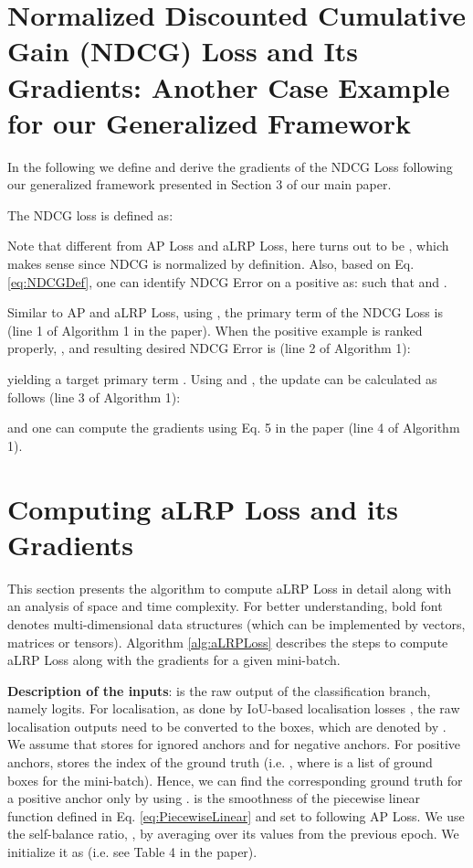 \documentclass{article}
\begin{document}
\section{Normalized Discounted Cumulative Gain (NDCG) Loss and Its Gradients: Another Case Example for our Generalized Framework}
In the following we define and derive the gradients of the NDCG Loss \cite{OptimizingUpperBound} following our generalized framework presented in Section 3 of our main paper.

The NDCG loss is defined as:

Note that different from AP Loss and aLRP Loss, here  turns out to be , which makes sense since NDCG is normalized by definition. Also, based on Eq. \ref{eq:NDCGDef}, one can identify NDCG Error on a positive as:  such that  and  .  

Similar to AP and aLRP Loss, using , the primary term of the NDCG Loss is  (line 1 of Algorithm 1 in the paper). When the positive example  is ranked properly, , and resulting desired NDCG Error is (line 2 of Algorithm 1):

yielding a target primary term . Using  and , the update can be calculated as follows (line 3 of Algorithm 1):

and one can compute the gradients using Eq. 5 in the paper (line 4 of Algorithm 1). \section{Computing aLRP Loss and its Gradients}
This section presents the algorithm to compute aLRP Loss in detail along with an analysis of space and time complexity. For better understanding, bold font denotes multi-dimensional data structures (which can be implemented by vectors, matrices or tensors). Algorithm \ref{alg:aLRPLoss} describes the steps to compute aLRP Loss along with the gradients for a given mini-batch. 

\textbf{Description of the inputs}:  is the raw output of the classification branch, namely logits. For localisation, as done by IoU-based localisation losses \cite{UnitBox,GIoULoss}, the raw localisation outputs need to be converted to the boxes, which are denoted by . We assume that  stores  for ignored anchors and  for negative anchors. For positive anchors,  stores the index of the ground truth (i.e. , where  is a list of ground boxes for the mini-batch). Hence, we can find the corresponding ground truth for a positive anchor only by using .  is the smoothness of the piecewise linear function defined in Eq. \ref{eq:PiecewiseLinear} and set to  following AP Loss. We use the self-balance ratio, , by averaging over its values from the previous epoch. We initialize it as  (i.e. see Table 4 in the paper).
\end{document}
